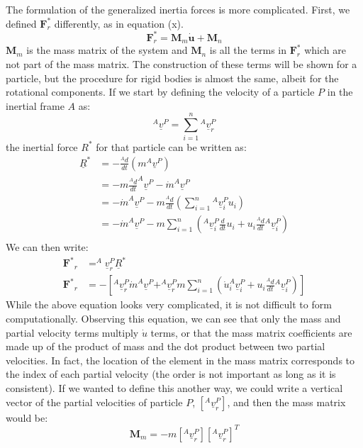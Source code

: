 \documentclass[twocolumn,10pt]{asme2e}
\begin{document}
The formulation of the generalized inertia forces is more complicated.
First, we defined $\mathbf{F}_r^*$ differently, as in equation (x).
\begin{equation}
\mathbf{F}_r^* = \mathbf{M}_m \mathbf{\dot{u}} + \mathbf{M}_n
\end{equation}
$\mathbf{M}_m$ is the mass matrix of the system and $\mathbf{M}_n$ is all the
terms in $\mathbf{F}_r^*$ which are not part of the mass matrix.  The
construction of these terms will be shown for a particle, but the procedure for
rigid bodies is almost the same, albeit for the rotational components.  If we
start by defining the velocity of a particle $P$ in the inertial frame $A$ as:
\begin{equation}
^{A}\underline{v}^{P} = \sum_{i=1}^{n} {} ^{A}\underline{v}_{r}^{P}
\end{equation}
the inertial force $R^*$ for that particle can be written as:
\begin{align}
\underline{R}^* &= -\frac{^{A} d}{dt}(m ^A\underline{v}^P) \\
&= -m \frac{^{A}d}{dt}^A\underline{v}^P - \dot{m} ^A\underline{v}^P \\
&= -\dot{m} ^A\underline{v}^P - m \frac{^{A}d}{dt}\left(\sum_{i=1}^{n}{} ^A
\underline{v}^P_i u_i \right) \\
&= -\dot{m} ^A\underline{v}^P - m \sum_{i=1}^{n} \left( ^A\underline{v}_i^P
\frac{d}{dt}u_i + u_i \frac{^{A}d}{dt} {}^A\underline{v}^P_i \right) \\
\end{align}
We can then write:
\begin{align}
\mathbf{F^*}_r &= ^A\underline{v}^P_r \underline{R}^{*} \\
\mathbf{F^*}_r &= - \left[
                   ^A\underline{v}^P_r \dot{m} ^A\underline{v}^P +
                   ^A\underline{v}^P_r m \sum_{i=1}^{n} \left(
                   \dot{u}_i ^A\underline{v}^P_i + u_i
                   \frac{^{A}d}{dt} {}^A\underline{v}^P_i
                   \right)
                   \right]
\end{align}
While the above equation looks very complicated, it is not difficult to form
computationally.
Observing this equation, we can see that only the mass and partial velocity
terms multiply $\dot{u}$ terms, or that the mass matrix coefficients are made
up of the product of mass and the dot product between two partial velocities.
In fact, the location of the element in the mass matrix corresponds to the
index of each partial velocity (the order is not important as long as it is
consistent).
If we wanted to define this another way, we could write a vertical vector of
the partial velocities of particle $P$, $[^A\underline{v}^P_r]$, and then the
mass matrix would be:
\begin{equation}
\mathbf{M}_m = -m \left[^A\underline{v}_r^P\right] \left[^A\underline{v}_r^P \right]^T
\end{equation}
\end{document}
